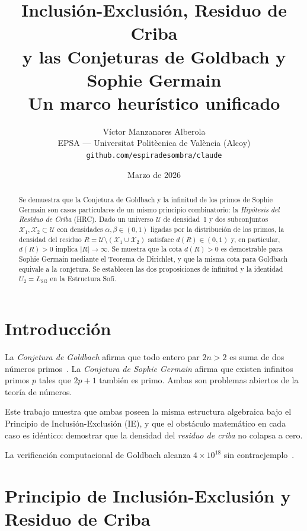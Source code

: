 \documentclass[11pt,a4paper]{article}
\title{\textbf{Inclusión-Exclusión, Residuo de Criba\\
       y las Conjeturas de Goldbach y Sophie Germain}\\[0.4em]
       \large Un marco heurístico unificado}
\author{Víctor Manzanares Alberola\\
        \small EPSA --- Universitat Politècnica de València (Alcoy)\\
        \small \texttt{github.com/espiradesombra/claude}}
\date{Marzo de 2026}
\theoremstyle{definition}
\newcommand{\cA}{\mathcal{X}_1}       %
\newcommand{\cB}{\mathcal{X}_2}       %
\newcommand{\cU}{\mathcal{U}}         %
\begin{document}
\maketitle

\begin{abstract}
Se demuestra que la Conjetura de Goldbach y la infinitud de los primos de
Sophie Germain son casos particulares de un mismo principio combinatorio:
la \emph{Hipótesis del Residuo de Criba} (HRC).  Dado un universo $\cU$ de
densidad~1 y dos subconjuntos $\cA, \cB \subset \cU$ con densidades
$\alpha, \beta \in (0,1)$ ligadas por la distribución de los primos, la
densidad del residuo $R = \cU \setminus (\cA \cup \cB)$ satisface
$d(R) \in (0,1)$ y, en particular, $d(R)>0$ implica $|R|\to\infty$.
Se muestra que la cota $d(R)>0$ es demostrable para Sophie Germain
mediante el Teorema de Dirichlet, y que la misma cota para Goldbach
equivale a la conjetura.  Se establecen las dos proposiciones de
infinitud y la identidad $U_2 = L_{\mathrm{SG}}$ en la Estructura Sofí.
\end{abstract}

\tableofcontents
\bigskip

\section{Introducción}

La \emph{Conjetura de Goldbach} afirma que todo entero par $2n>2$ es suma
de dos números primos~\cite{goldbach1742}.  La \emph{Conjetura de Sophie
Germain} afirma que existen infinitos primos $p$ tales que $2p+1$ también
es primo.  Ambas son problemas abiertos de la teoría de números.

Este trabajo muestra que ambas poseen la misma estructura algebraica bajo
el Principio de Inclusión-Exclusión (IE), y que el obstáculo matemático
en cada caso es idéntico: demostrar que la densidad del \emph{residuo de
criba} no colapsa a cero.

\medskip

La verificación computacional de Goldbach alcanza $4\times10^{18}$ sin
contraejemplo~\cite{oliveira2014}.

\section{Principio de Inclusión-Exclusión y Residuo de Criba}
\end{document}

